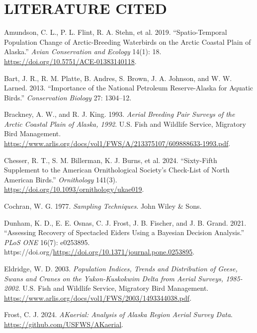 \documentclass[
]{article}
\newlength{\cslhangindent}
\newenvironment{CSLReferences}[2] %
 {\begin{list}{}{%
  \setlength{\itemindent}{0pt}
  \setlength{\leftmargin}{0pt}
  \setlength{\parsep}{0pt}
  \ifodd #1
   \setlength{\leftmargin}{\cslhangindent}
   \setlength{\itemindent}{-1\cslhangindent}
  \fi
  \setlength{\itemsep}{#2\baselineskip}}}
 {\end{list}}
\begin{document}
\section*{LITERATURE CITED}\label{literature-cited}

\protect{}\label{refs}
\begin{CSLReferences}{1}{1}
Amundson, C. L., P. L. Flint, R. A. Stehn, et al. 2019.
{``Spatio-Temporal Population Change of Arctic-Breeding Waterbirds on
the Arctic Coastal Plain of Alaska.''} \emph{Avian Conservation and
Ecology} 14(1): 18. \url{https://doi.org/10.5751/ACE-01383140118}.

Bart, J. R., R. M. Platte, B. Andres, S. Brown, J. A. Johnson, and W. W.
Larned. 2013. {``Importance of the National Petroleum Reserve-Alaska for
Aquatic Birds.''} \emph{Conservation Biology} 27: 1304--12.

Brackney, A. W., and R. J. King. 1993. \emph{Aerial Breeding Pair
Surveys of the Arctic Coastal Plain of Alaska, 1992}. {U.S. Fish and
Wildlife Service}, {Migratory Bird Management}.
\url{https://www.arlis.org/docs/vol1/FWS/A/213375107/609888633-1993.pdf}.

Chesser, R. T., S. M. Billerman, K. J. Burns, et al. 2024.
{``Sixty-Fifth Supplement to the American Ornithological Society's
Check-List of North American Birds.''} \emph{Ornithology} 141(3).
\url{https://doi.org/10.1093/ornithology/ukae019}.

Cochran, W. G. 1977. \emph{Sampling Techniques}. John Wiley \& Sons.

Dunham, K. D., E. E. Osnas, C. J. Frost, J. B. Fischer, and J. B. Grand.
2021. {``Assessing Recovery of Spectacled Eiders Using a Bayesian
Decision Analysis.''} \emph{PLoS ONE} 16(7): e0253895.
https://doi.org/\url{https://doi.org/10.1371/journal.pone.0253895}.

Eldridge, W. D. 2003. \emph{Population Indices, Trends and Distribution
of Geese, Swans and Cranes on the Yukon-Kuskokwim Delta from Aerial
Surveys, 1985-2002}. {U.S. Fish and Wildlife Service}, {Migratory Bird
Management}.
\url{https://www.arlis.org/docs/vol1/FWS/2003/1493344038.pdf}.

Frost, C. J. 2024. \emph{AKaerial: Analysis of Alaska Region Aerial
Survey Data}. \url{https://github.com/USFWS/AKaerial}.


\end{CSLReferences}
\end{document}
